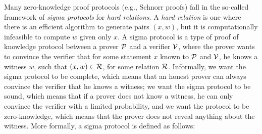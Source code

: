 



Many zero-knowledge proof protocols (e.g., Schnorr proofs) fall in the so-called framework of \emph{sigma protocols} for \emph{hard relations}. 
A \emph{hard relation} is one where there is an efficient algorithm to generate pairs $(x,w)$, but it is computationally infeasible to compute $w$ given only $x$.
A sigma protocol is a type of proof of knowledge protocol between a prover $\mathcal{P}$ and a verifier $\mathcal{V}$, where the prover wants to convince the verifier that for some statement $x$ known to $\mathcal{P}$ and $\mathcal{V}$, he knows a witness $w$, such that $(x,w) \in \mathcal{R}$, for some relation $\mathcal{R}$. Informally, we want the sigma protocol to be complete, which means that an honest prover can always convince the verifier that he knows a witness; we want the sigma protocol to be sound, which means that if a prover does not know a witness, he can only convince the verifier with a limited probability, and we want the protocol to be zero-knowledge, which means that the prover does not reveal anything about the witness.
More formally, a sigma protocol is defined as follows: 

